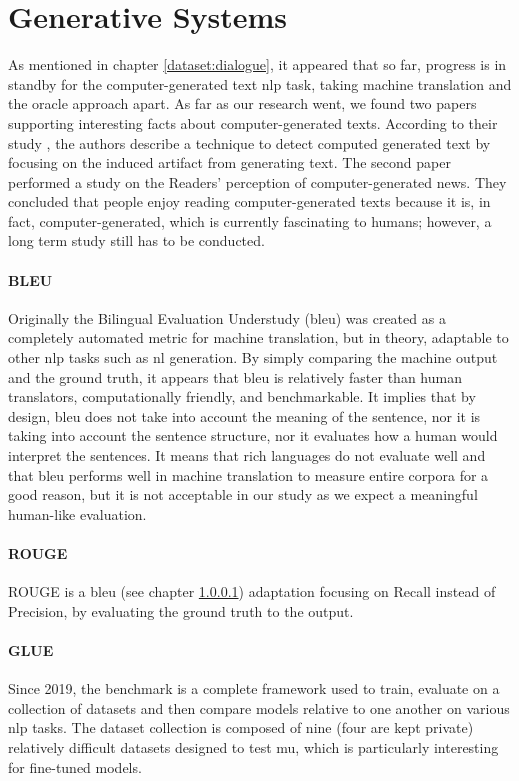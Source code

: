 \section{Generative Systems}
As mentioned in chapter \ref{dataset:dialogue}, it appeared that so far, progress is in standby for the computer-generated text \gls{nlp} task, taking machine translation and the \gls{oracle} approach apart. As far as our research went, we found two papers supporting interesting facts about computer-generated texts. According to their study \autocite{paper:journals/corr/abs-1906-04043}, the authors describe a technique to detect computed generated text by focusing on the induced artifact from generating text. The second paper \autocite{paper:10.1177/1464884916641269} performed a study on the Readers’ perception of computer-generated news. They concluded that people enjoy reading computer-generated texts because it is, in fact, computer-generated, which is currently fascinating to humans; however, a long term study still has to be conducted.

\paragraph{BLEU}
\label{eval:bleu}
Originally the Bilingual Evaluation Understudy (\gls{bleu}) was created as a completely automated metric for machine translation, but in theory, adaptable to other \gls{nlp} tasks such as \gls{nl} generation. By simply comparing the machine output and the ground truth, it appears that \gls{bleu} is relatively faster than human translators, computationally friendly, and benchmarkable. It implies that by design, \gls{bleu} does not take into account the meaning of the sentence, nor it is taking into account the sentence structure, nor it evaluates how a human would interpret the sentences. It means that rich languages do not evaluate well and that \gls{bleu} performs well in machine translation to measure entire corpora for a good reason, but it is not acceptable in our study as we expect a meaningful human-like evaluation.

\paragraph{ROUGE}
ROUGE is a \gls{bleu} (see chapter \ref{eval:bleu}) adaptation focusing on Recall instead of Precision, by evaluating the ground truth to the output.

\paragraph{GLUE}
Since 2019, the  benchmark is a complete framework used to train, evaluate on a collection of datasets and then compare models relative to one another on various \gls{nlp} tasks. The dataset collection is composed of nine (four are kept private) relatively difficult datasets designed to test \gls{mu}, which is particularly interesting for fine-tuned models.

